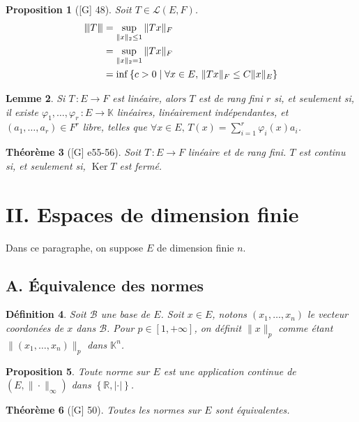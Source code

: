 \documentclass[10pt, a4paper, parskip=full, twoside, twocolumn]{report}
\newtheorem{definition}{Définition}
\newtheorem{theorem}[definition]{Théorème}
\newtheorem{proposition}[definition]{Proposition}
\newtheorem{lemma}[definition]{Lemme}
\newcommand{\IK}{\mathbb{K}}
\newcommand{\IR}{\mathbb{R}}
\newcommand{\B}{\mathcal{B}}
\DeclareMathOperator{\Ker}{Ker}
\newcommand{\vertiii}[1]{{\left\vert\kern-0.25ex\left\vert\kern-0.25ex\left\vert #1 
    \right\vert\kern-0.25ex\right\vert\kern-0.25ex\right\vert}}
\begin{document}
\begin{proposition}[\textnormal{[G] 48}]
	Soit $T\in\mathcal{L}(E,F)$.
	\begin{align*}
		\vertiii{T} &= \sup_{\|x\|_2\leq 1} \|Tx\|_F \\
		&= \sup_{\|x\|_2 = 1} \|Tx\|_F \\
		&= \inf\left\{c>0\mid \forall x\in E,\, \|Tx\|_F \leq C\|x\|_E\right\}
	\end{align*}
\end{proposition}

\begin{lemma}
	Si $T\,\colon E\to F$ est linéaire, alors $T$ est de rang fini $r$ si, et seulement si, il existe $\varphi_1,\dots,\varphi_r\,\colon E\to \IK$ linéaires, linéairement indépendantes, et $(a_1,\dots,a_r)\in F^r$ libre, telles que $\forall x\in E,\, T(x) = \sum_{i=1}^{r}\varphi_i(x) a_i$.
\end{lemma}

\begin{theorem}[\textnormal{[G] e55-56}]
	Soit $T\,\colon E\to F$ linéaire et de rang fini.
	$T$ est continu si, et seulement si, $\Ker T$ est fermé.
\end{theorem}

\section*{II. Espaces de dimension finie}
\textcolor{paragraphtext}{Dans ce paragraphe, on suppose $E$ de dimension finie $n$.}
\subsection*{A. Équivalence des normes}
\begin{definition}
	Soit $\B$ une base de $E$. Soit $x\in E$, notons $(x_1,\dots, x_n)$ le vecteur coordonées de $x$ dans $\B$. Pour $p\in[1,+\infty]$, on définit $\|x\|_p$ comme étant $\|(x_1,\dots, x_n)\|_p$ dans $\IK^n$.
\end{definition}

\begin{proposition}
	Toute norme sur $E$ est une application continue de $\left(E,\|\cdot\|_{\infty}\right)$ dans $\left\{\IR, \vert\cdot\vert\right\}$.
\end{proposition}

\begin{tcolorbox}[
    breakable, %
    colback=developpement, %
    colframe=gray!0!black, %
    boxrule=0pt, %
    arc=1mm, %
	boxsep=0pt,
	left=0pt, right=0pt, top=0pt, bottom=0pt
]
\begin{theorem}[\textnormal{[G] 50}]
	\label{208dev11}
	Toutes les normes sur $E$ sont équivalentes.
\end{theorem}
\end{tcolorbox}
\end{document}
